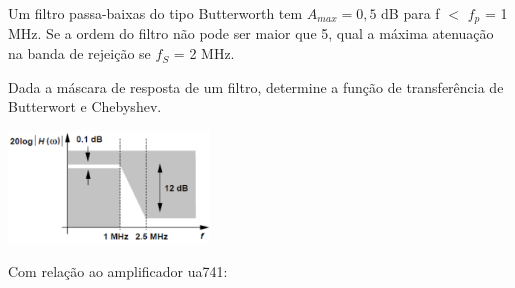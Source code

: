 \documentclass[addpoints]{exam}
\begin{document}
\begin{questions}
\question Um filtro passa-baixas do tipo Butterworth tem $A_{max} = 0,5$ dB para f $<$ $f_p$ = 1 MHz. Se a ordem do filtro não pode ser maior que 5, qual a máxima atenuação na banda de rejeição se $f_S$ = 2 MHz.

\question Dada a máscara de resposta de um filtro, determine a função de transferência de Butterwort e Chebyshev.

\begin{center}
\includegraphics[width=0.4\textwidth]{imagens/3.png}
\end{center}

\question Com relação ao amplificador ua741:


\end{questions}
\end{document}

